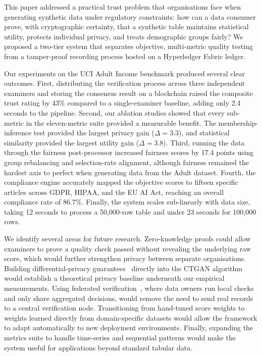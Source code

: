 
This paper addressed a practical trust problem that organisations face when generating synthetic data under regulatory constraints: how can a data consumer prove, with cryptographic certainty, that a synthetic table maintains statistical utility, protects individual privacy, and treats demographic groups fairly? We proposed a two-tier system that separates objective, multi-metric quality testing from a tamper-proof recording process hosted on a Hyperledger Fabric ledger.

Our experiments on the UCI Adult Income benchmark produced several clear outcomes. First, distributing the verification process across three independent examiners and storing the consensus result on a blockchain raised the composite trust rating by 43\% compared to a single-examiner baseline, adding only 2.4 seconds to the pipeline. Second, our ablation studies showed that every sub-metric in the eleven-metric suite provided a measurable benefit. The membership-inference test provided the largest privacy gain ($\Delta{=}3.3$), and statistical similarity provided the largest utility gain ($\Delta{=}3.8$). Third, running the data through the fairness post-processor increased fairness scores by 17.4 points using group rebalancing and selection-rate alignment, although fairness remained the hardest axis to perfect when generating data from the Adult dataset. Fourth, the compliance engine accurately mapped the objective scores to fifteen specific articles across GDPR, HIPAA, and the EU AI Act, reaching an overall compliance rate of 86.7\%. Finally, the system scales sub-linearly with data size, taking 12 seconds to process a 50,000-row table and under 23 seconds for 100,000 rows.

We identify several areas for future research. Zero-knowledge proofs could allow examiners to prove a quality check passed without revealing the underlying raw score, which would further strengthen privacy between separate organisations. Building differential-privacy guarantees~\cite{dwork2006differential} directly into the CTGAN algorithm would establish a theoretical privacy baseline underneath our empirical measurements. Using federated verification~\cite{bonawitz2017practical}, where data owners run local checks and only share aggregated decisions, would remove the need to send real records to a central verification node. Transitioning from hand-tuned score weights to weights learned directly from domain-specific datasets would allow the framework to adapt automatically to new deployment environments. Finally, expanding the metrics suite to handle time-series and sequential patterns would make the system useful for applications beyond standard tabular data.
